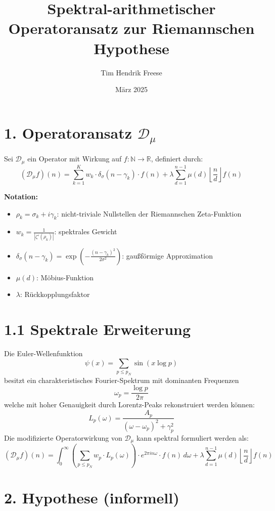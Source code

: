 \documentclass[12pt]{article}
\title{Spektral-arithmetischer Operatoransatz zur Riemannschen Hypothese}
\author{Tim Hendrik Freese}
\date{März 2025}
\begin{document}
\maketitle

\section*{1. Operatoransatz \boldmath$\mathcal{D}_\mu$}

Sei $\mathcal{D}_\mu$ ein Operator mit Wirkung auf $f : \mathbb{N} \to \mathbb{R}$, definiert durch:
\[
(\mathcal{D}_\mu f)(n) = \sum_{k=1}^{K} w_k \cdot \delta_\sigma(n - \gamma_k) \cdot f(n)
+ \lambda \sum_{d=1}^{n-1} \mu(d) \left\lfloor \frac{n}{d} \right\rfloor f(n)
\]

\textbf{Notation:}
\begin{itemize}
  \item $\rho_k = \sigma_k + i \gamma_k$: nicht-triviale Nullstellen der Riemannschen Zeta-Funktion
  \item $w_k = \frac{1}{|\zeta'(\rho_k)|}$: spektrales Gewicht
  \item $\delta_\sigma(n - \gamma_k) = \exp\left( -\frac{(n - \gamma_k)^2}{2 \sigma^2} \right)$: gaußförmige Approximation
  \item $\mu(d)$: Möbius-Funktion
  \item $\lambda$: Rückkopplungsfaktor
\end{itemize}

\section*{1.1 Spektrale Erweiterung}

Die Euler-Wellenfunktion
\[
\psi(x) = \sum_{p \leq p_N} \sin(x \log p)
\]
besitzt ein charakteristisches Fourier-Spektrum mit dominanten Frequenzen
\[
\omega_p = \frac{\log p}{2\pi}
\]
welche mit hoher Genauigkeit durch Lorentz-Peaks rekonstruiert werden können:
\[
L_p(\omega) = \frac{A_p}{(\omega - \omega_p)^2 + \gamma_p^2}
\]
Die modifizierte Operatorwirkung von $\mathcal{D}_\mu$ kann spektral formuliert werden als:
\[
(\mathcal{D}_\mu f)(n) =
\int_0^\infty \left( \sum_{p \leq p_N} w_p \cdot L_p(\omega) \right) \cdot e^{2\pi i n \omega} \cdot f(n) \, d\omega
+ \lambda \sum_{d=1}^{n-1} \mu(d) \left\lfloor \frac{n}{d} \right\rfloor f(n)
\]

\section*{2. Hypothese (informell)}
\end{document}

